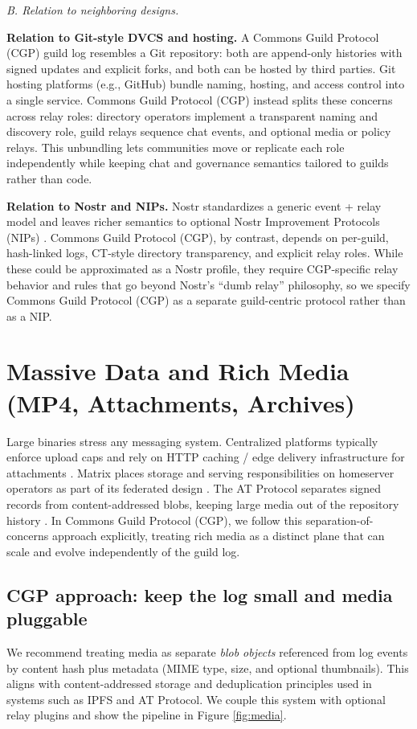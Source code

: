 \documentclass[conference]{IEEEtran}
\newcommand{\cgp}{Commons Guild Protocol (CGP)\xspace}
\newcommand{\atproto}{AT Protocol\xspace}
\begin{document}
\medskip
\noindent\textit{B. Relation to neighboring designs.}

\textbf{Relation to Git-style DVCS and hosting.}
A \cgp guild log resembles a Git repository: both are append-only histories with signed updates and explicit forks, and both can be hosted by third parties.
Git hosting platforms (e.g., GitHub) bundle naming, hosting, and access control into a single service.
\cgp instead splits these concerns across relay roles: directory operators implement a transparent naming and discovery role, guild relays sequence chat events, and optional media or policy relays.
This unbundling lets communities move or replicate each role independently while keeping chat and governance semantics tailored to guilds rather than code.

\textbf{Relation to Nostr and NIPs.}
Nostr standardizes a generic event + relay model and leaves richer semantics to optional Nostr Improvement Protocols (NIPs) \cite{nostrNIP01}.
\cgp, by contrast, depends on per-guild, hash-linked logs, CT-style directory transparency, and explicit relay roles.
While these could be approximated as a Nostr profile, they require CGP-specific relay behavior and rules that go beyond Nostr's ``dumb relay'' philosophy, so we specify \cgp as a separate guild-centric protocol rather than as a NIP.


\section{Massive Data and Rich Media (MP4, Attachments, Archives)}
Large binaries stress any messaging system. Centralized platforms typically enforce upload caps and rely on HTTP caching / edge delivery infrastructure for attachments \cite{rfc7234}. Matrix places storage and serving responsibilities on homeserver operators as part of its federated design \cite{jacob2020matrixdecomposition}. The \atproto separates signed records from content-addressed blobs, keeping large media out of the repository history \cite{kleppmann2024atproto}.  In \cgp, we follow this separation-of-concerns approach explicitly, treating rich media as a distinct plane that can scale and evolve independently of the guild log.

\subsection{CGP approach: keep the log small and media pluggable}
We recommend treating media as separate \emph{blob objects} referenced from log events by content hash plus metadata (MIME type, size, and optional thumbnails). This aligns with content-addressed storage and deduplication principles used in systems such as IPFS \cite{ipfs} and \atproto \cite{atprotoBlobSpec}. We couple this system with optional relay plugins and show the pipeline in Figure \ref{fig:media}.
\end{document}
